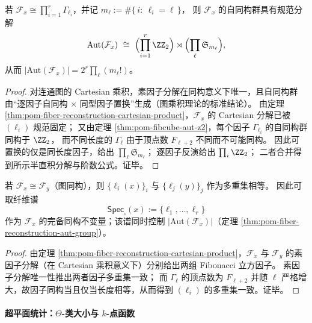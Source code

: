 \begin{theorem}[一般纤维重构图的自同构群]\label{thm:pom-fiber-reconstruction-aut-group}
若 \(\mathcal F_x\cong\prod_{i=1}^r\Gamma_{\ell_i}\)，并记
\(
m_\ell:=\#\{\,i:\ \ell_i=\ell\,\}
\)，
则 \(\mathcal F_x\) 的自同构群具有规范分解
\[
\mathrm{Aut}(\mathcal F_x)\ \cong\
\Bigl(\prod_{i=1}^r \ZZ_2\Bigr)\rtimes
\Bigl(\prod_{\ell}\mathfrak S_{m_\ell}\Bigr),
\]
从而
\(
|\mathrm{Aut}(\mathcal F_x)|=2^{r}\prod_{\ell}(m_\ell!)
\)。
\end{theorem}
\begin{proof}
对连通图的 Cartesian 乘积，素因子分解在同构意义下唯一，且自同构群由“逐因子自同构 \(\times\) 同型因子置换”生成（图乘积理论的标准结论）。
由定理 \ref{thm:pom-fiber-reconstruction-cartesian-product}，\(\mathcal F_x\) 的 Cartesian 分解已被 \((\ell_i)\) 规范固定；
又由定理 \ref{thm:pom-fibcube-aut-z2}，每个因子 \(\Gamma_{\ell_i}\) 的自同构群同构于 \(\ZZ_2\)，
而不同长度的 \(\Gamma_\ell\) 由于顶点数 \(F_{\ell+2}\) 不同而不可能同构。
因此可置换的仅是同长度因子，给出 \(\prod_\ell\mathfrak S_{m_\ell}\)；
逐因子反演给出 \(\prod_i\ZZ_2\)；
二者合并得到所示半直积分解与阶数公式。证毕。
\end{proof}

\begin{corollary}[分量长度多重集为完备同构不变量]\label{cor:pom-fiber-reconstruction-spectrum-complete}
若 \(\mathcal F_x\cong \mathcal F_y\)（图同构），则
\(
\{\ell_i(x)\}_i
\)
与
\(
\{\ell_j(y)\}_j
\)
作为多重集相等。
因此可取纤维谱
\[
\mathsf{Spec}_{\square}(x):=\{\ell_1,\dots,\ell_r\}
\]
作为 \(\mathcal F_x\) 的完备同构不变量；该谱同时控制 \(|\mathrm{Aut}(\mathcal F_x)|\)（定理 \ref{thm:pom-fiber-reconstruction-aut-group}）。
\end{corollary}
\begin{proof}
由定理 \ref{thm:pom-fiber-reconstruction-cartesian-product}，\(\mathcal F_x\) 与 \(\mathcal F_y\) 的素因子分解（在 Cartesian 乘积意义下）分别给出两组 Fibonacci 立方因子。
素因子分解唯一性推出两者因子多重集一致；
而 \(\Gamma_\ell\) 的顶点数为 \(F_{\ell+2}\) 并随 \(\ell\) 严格增大，故因子同构当且仅当长度相等，从而得到 \((\ell_i)\) 的多重集一致。证毕。
\end{proof}

\paragraph{超平面统计：\(\Theta\)-类大小与 \(k\)-点函数}

